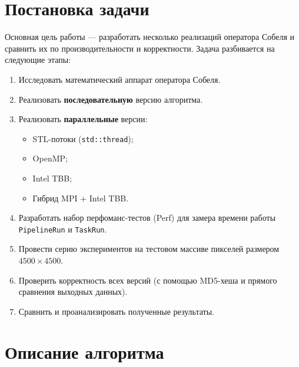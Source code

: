 \documentclass[12pt]{article}
\begin{document}
\section{Постановка задачи}

Основная цель работы — разработать несколько реализаций оператора Собеля и сравнить их по производительности и корректности. Задача разбивается на следующие этапы:
\begin{enumerate}
    \item Исследовать математический аппарат оператора Собеля.
    \item Реализовать \textbf{последовательную} версию алгоритма.
    \item Реализовать \textbf{параллельные} версии:
    \begin{itemize}
        \item STL-потоки (\texttt{std::thread});
        \item OpenMP;
        \item Intel TBB;
        \item Гибрид MPI + Intel TBB.
    \end{itemize}
    \item Разработать набор перфоманс-тестов (Perf) для замера времени работы \texttt{PipelineRun} и \texttt{TaskRun}.
    \item Провести серию экспериментов на тестовом массиве пикселей размером $4500 \times 4500$.
    \item Проверить корректность всех версий (с помощью MD5-хеша и прямого сравнения выходных данных).
    \item Сравнить и проанализировать полученные результаты.
\end{enumerate}


\section{Описание алгоритма}
\end{document}
